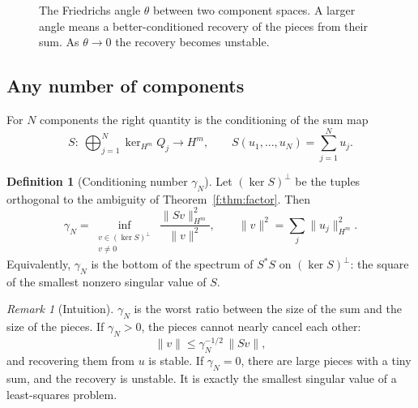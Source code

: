 \documentclass[11pt]{article}
\theoremstyle{plain}
\theoremstyle{definition}
\newtheorem{definition}[theorem]{Definition}
\theoremstyle{remark}
\newtheorem{remark}[theorem]{Remark}
\newenvironment{intuition}{\begin{remark}[Intuition]}{\end{remark}}
\begin{document}
\begin{figure}[!htb]
\centering
{}
\caption{The Friedrichs angle $\theta$ between two component spaces. A larger angle means a better-conditioned recovery of the pieces from their sum. As $\theta\to0$ the recovery becomes unstable.}\label{f:fig:friedrichs}
\end{figure}

\subsection{Any number of components}

For $N$ components the right quantity is the conditioning of the sum map
\[
S:\ \bigoplus_{j=1}^N\ker_{H^m}Q_j\to H^m,\qquad S(u_1,\dots,u_N)=\sum_{j=1}^Nu_j .
\]

\begin{definition}[{Conditioning number $\gamma_N$}]\label{def:gamma}
Let $(\ker S)^\perp$ be the tuples orthogonal to the ambiguity of Theorem~\ref{f:thm:factor}. Then
\[
\gamma_N=\inf_{\substack{v\in(\ker S)^\perp\\ v\ne0}}\ \frac{\|Sv\|_{H^m}^2}{\|v\|^2},
\qquad \|v\|^2=\sum_j\|u_j\|_{H^m}^2 .
\]
Equivalently, $\gamma_N$ is the bottom of the spectrum of $S^*S$ on $(\ker S)^\perp$: the square of the smallest nonzero singular value of $S$.
\end{definition}

\begin{intuition}
$\gamma_N$ is the worst ratio between the size of the sum and the size of the pieces. If $\gamma_N>0$, the pieces cannot nearly cancel each other:
\[
\|v\|\le\gamma_N^{-1/2}\,\|Sv\| ,
\]
and recovering them from $u$ is stable. If $\gamma_N=0$, there are large pieces with a tiny sum, and the recovery is unstable. It is exactly the smallest singular value of a least-squares problem.
\end{intuition}
\end{document}

